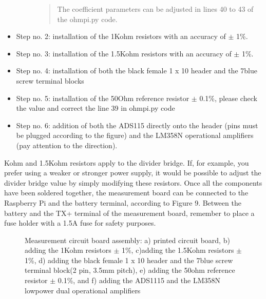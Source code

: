 \documentclass[letterpaper,10pt,english]{sphinxmanual}
\let\sphinxpxdimen\pdfpxdimen\else\newdimen\sphinxpxdimen
\begin{document}
\begin{itemize}
\begin{description}
\begin{quote}
\sphinxAtStartPar
The coefficient parameters can be adjusted in lines 40 to 43 of the ohmpi.py code.
\end{quote}

\end{description}

\item {} 
\sphinxAtStartPar
Step no. 2: installation of the 1\sphinxhyphen{}Kohm resistors with an accuracy of \(\pm\) 1\%.

\item {} 
\sphinxAtStartPar
Step no. 3: installation of the 1.5\sphinxhyphen{}Kohm resistors with an accuracy of \(\pm\) 1\%.

\item {} 
\sphinxAtStartPar
Step no. 4: installation of both the black female 1 x 10 header and the 7\sphinxhyphen{}blue screw terminal blocks

\item {} 
\sphinxAtStartPar
Step no. 5: installation of the 50\sphinxhyphen{}Ohm reference resistor \(\pm\) 0.1\%, please check the value and correct the line 39 in ohmpi.py code

\item {} 
\sphinxAtStartPar
Step no. 6: addition of both the ADS115 directly onto the header (pins must be plugged according to the figure) and the LM358N operational amplifiers (pay attention to the direction).

\end{itemize}

\sphinxhyphen{}Kohm and 1.5\sphinxhyphen{}Kohm resistors apply to the divider bridge. If, for example, you prefer using a weaker
or stronger power supply, it would be possible to adjust the divider bridge value by simply modifying these resistors.
Once all the components have been soldered together, the measurement board can be connected to the Raspberry Pi and the
battery terminal, according to Figure 9. Between the battery and the TX+ terminal of the measurement board, remember to
place a fuse holder with a 1.5\sphinxhyphen{}A fuse for safety purposes.

\begin{figure}[htbp]
\centering
\capstart

\noindent\sphinxincludegraphics[width=800\sphinxpxdimen,height=500\sphinxpxdimen]{{measurement_board}.jpg}
\caption{Measurement circuit board assembly: a) printed circuit board, b) adding the 1\sphinxhyphen{}Kohm resistors \(\pm\) 1\%, c)adding the 1.5\sphinxhyphen{}Kohm resistors \(\pm\) 1\%, d) adding the black female 1 x 10 header and the 7\sphinxhyphen{}blue screw terminal block(2 pin, 3.5\sphinxhyphen{}mm pitch), e) adding the 50\sphinxhyphen{}ohm reference resistor \(\pm\) 0.1\%, and f) adding the ADS1115 and the LM358N low\sphinxhyphen{}power dual operational amplifiers}\label{\detokenize{V1_01:id2}}\end{figure}
\end{document}
